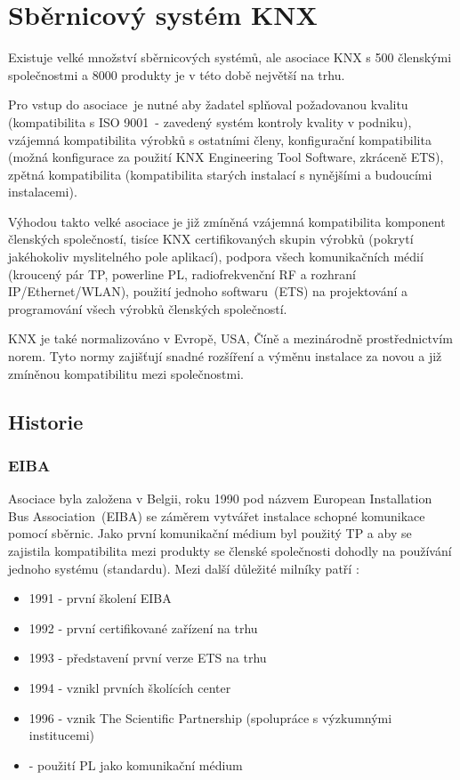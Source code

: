\chapter{Sběrnicový systém KNX}
Existuje velké množství sběrnicových systémů, ale asociace KNX s 500 členskými společnostmi a 8000 produkty je v této době největší na trhu. \cite{Asociace KNX}

Pro vstup do asociace~je nutné aby žadatel splňoval požadovanou kvalitu (kompatibilita s ISO 9001~- zavedený systém kontroly kvality v podniku), vzájemná kompatibilita výrobků s ostatními členy, konfigurační kompatibilita (možná konfigurace za použití KNX Engineering Tool Software, zkráceně ETS), zpětná kompatibilita (kompatibilita starých instalací s nynějšími a budoucími instalacemi). \cite{KNX principles}

Výhodou takto velké asociace je již zmíněná vzájemná kompatibilita komponent členských společností, tisíce KNX certifikovaných skupin výrobků (pokrytí jakéhokoliv myslitelného pole aplikací), podpora všech komunikačních médií (kroucený pár TP, powerline PL, radiofrekvenční RF a rozhraní IP/Ethernet/WLAN), použití jednoho softwaru~(ETS) na projektování a programování všech výrobků členských společností. \cite{KNX principles}

KNX je také normalizováno v Evropě, USA, Číně a mezinárodně prostřednictvím norem. Tyto normy zajišťují snadné rozšíření a výměnu instalace za novou a již zmíněnou kompatibilitu mezi společnostmi. \cite{KNX basics}

\section{Historie}
\subsection{EIBA}
Asociace byla založena v Belgii, roku 1990 pod názvem European Installation Bus Association~(EIBA) se záměrem vytvářet instalace schopné komunikace pomocí sběrnic. Jako první komunikační médium byl použitý TP a aby se zajistila kompatibilita mezi produkty se členské společnosti dohodly na používání jednoho systému (standardu). Mezi další důležité milníky patří \cite{KNX history}:
\begin{itemize}
\item 1991 - první školení EIBA
\item 1992 - první certifikované zařízení na trhu
\item 1993 - představení první verze ETS na trhu 
\item 1994 - vznikl prvních školících center
\item 1996 - vznik The Scientific Partnership (spolupráce s výzkumnými institucemi)
\item[] \hspace{0.821cm} - použití PL jako komunikační médium
\end{itemize}

